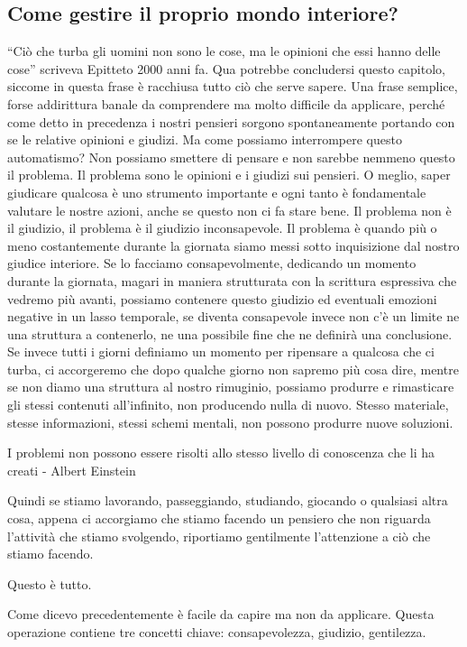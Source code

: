 \documentclass[12pt]{book} %
\begin{document}
\subsection{Come gestire il proprio mondo interiore?}
“Ciò che turba gli uomini non sono le cose, ma le opinioni che essi hanno delle cose” scriveva Epitteto 2000 anni fa.
Qua potrebbe concludersi questo capitolo, siccome in questa frase è racchiusa tutto ciò che serve sapere. Una frase
semplice, forse addirittura banale da comprendere ma molto difficile da applicare, perché come detto in precedenza i
nostri pensieri sorgono spontaneamente portando con se le relative opinioni e giudizi. Ma come possiamo interrompere
questo automatismo? Non possiamo smettere di pensare e non sarebbe nemmeno questo il problema. Il problema sono le
opinioni e i giudizi sui pensieri. O meglio, saper giudicare qualcosa è uno strumento importante e ogni tanto è
fondamentale valutare le nostre azioni, anche se questo non ci fa stare bene. Il problema non è il giudizio, il
problema è il giudizio inconsapevole. Il problema è quando più o meno costantemente durante la giornata siamo messi
sotto inquisizione dal nostro giudice interiore. Se lo facciamo consapevolmente, dedicando un momento durante la
giornata, magari in maniera strutturata con la scrittura espressiva che vedremo più avanti, possiamo contenere questo
giudizio ed eventuali emozioni negative in un lasso temporale, se diventa consapevole invece non
c'è un limite ne una struttura a contenerlo, ne una possibile fine che ne definirà una
conclusione. Se invece tutti i giorni definiamo un momento per ripensare a qualcosa che ci turba, ci accorgeremo che
dopo qualche giorno non sapremo più cosa dire, mentre se non diamo una struttura al nostro rimuginio, possiamo produrre
e rimasticare gli stessi contenuti all'infinito, non producendo nulla di nuovo. Stesso materiale,
stesse informazioni, stessi schemi mentali, non possono produrre nuove soluzioni. 

I problemi non possono essere risolti allo stesso livello di conoscenza che li ha creati - Albert Einstein

Quindi se stiamo lavorando, passeggiando, studiando, giocando o qualsiasi altra cosa, appena ci accorgiamo che stiamo
facendo un pensiero che non riguarda l'attività che stiamo svolgendo, riportiamo gentilmente
l'attenzione a ciò che stiamo facendo. 

Questo è tutto.

Come dicevo precedentemente è facile da capire ma non da applicare. Questa operazione contiene tre concetti chiave:
consapevolezza, giudizio, gentilezza.
\end{document}
